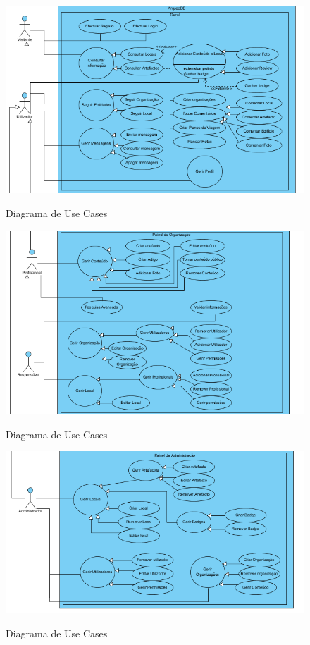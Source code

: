 ﻿\documentclass[12pt,a4paper]{article}
\begin{document}
\begin{figure}[h!]
\centering
\includegraphics[scale=1]{usecase/geral1}
\label{usecase}
\caption{Diagrama de Use Cases}
\end{figure}

\begin{figure}[h!]
\centering
\includegraphics[scale=1]{usecase/geral2}
\label{usecase}
\caption{Diagrama de Use Cases}
\end{figure}

\begin{figure}[h!]
\centering
\includegraphics[scale=1]{usecase/geral3}
\label{usecase}
\caption{Diagrama de Use Cases}
\end{figure}
\end{document}
